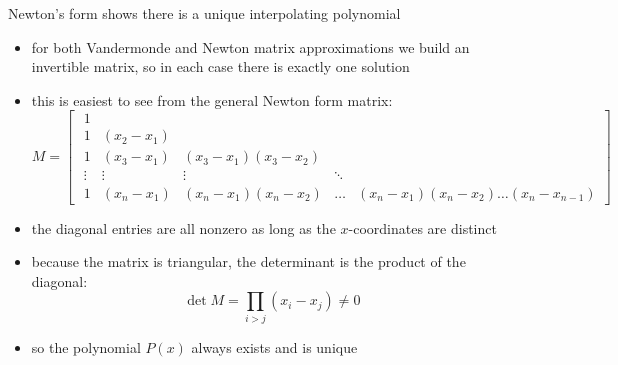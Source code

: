 \documentclass[10pt,hyperref]{beamer}
\begin{document}
\begin{frame}{Newton's form shows there is a unique interpolating polynomial}


\begin{itemize}\small
  \item for both Vandermonde and Newton matrix approximations we build an invertible matrix, so in each case there is exactly one solution
  \item this is easiest to see from the general Newton form matrix:
\scriptsize
  $$M = \begin{bmatrix}
  \,\,1 & & & &  \\
  \,\,1 & (x_2-x_1) & & & \\
  \,\,1 & (x_3-x_1) & (x_3 - x_1)(x_3 - x_2) & & \\
  \,\,\vdots & \vdots & \vdots & \ddots & \\
  \,\,1 & (x_n-x_1) & (x_n - x_1)(x_n - x_2) & \dots & (x_n-x_1)(x_n-x_2)\dots(x_n-x_{n-1})
  \end{bmatrix}$$
\small
  \item the diagonal entries are all nonzero as long as the $x$-coordinates are distinct
  \item because the matrix is triangular, the determinant is the product of the diagonal:
  	$$\det M = \prod_{i > j} (x_i-x_j) \ne 0$$
  \item so the polynomial $P(x)$ always exists and is unique
\end{itemize}
\end{frame}
\end{document}
